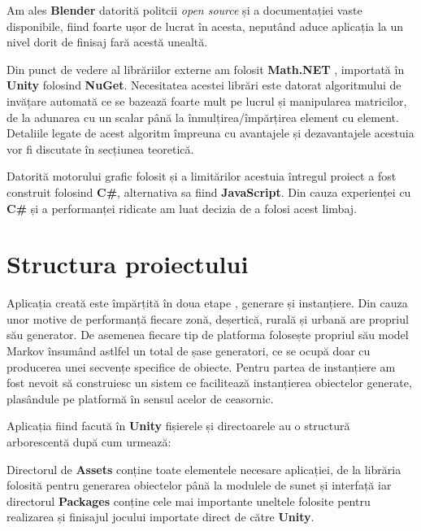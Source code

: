Am ales \textbf{Blender} datorită politcii \textit{open source} și a documentației vaste disponibile, fiind foarte ușor de lucrat în acesta, neputând aduce aplicația la un nivel dorit de finisaj fară acestă unealtă.\par

Din punct de vedere al librăriilor externe am folosit \textbf{Math.NET} , importată în \textbf{Unity} folosind \textbf{NuGet}. Necesitatea acestei librări este datorat algoritmului de invățare automată ce se bazează foarte mult pe lucrul și manipularea matricilor, de la adunarea cu un scalar până la înmulțirea/împărțirea element cu element. Detaliile legate de acest algoritm împreuna cu avantajele și dezavantajele acestuia vor fi discutate în secțiunea teoretică.\par

Datorită motorului grafic folosit și a limitărilor acestuia întregul proiect a fost construit folosind \textbf{C\#}, alternativa sa fiind \textbf{JavaScript}. Din cauza experienței cu \textbf{C\#} și a performanței ridicate am luat decizia de a folosi acest limbaj.\par

\section{Structura proiectului}

Aplicația creată este împărțită în doua etape , generare și instanțiere. Din cauza unor motive de performanță fiecare zonă, deșertică, rurală și urbană are propriul său generator. De asemenea fiecare tip de platforma folosește propriul său model Markov însumând astlfel un total de șase generatori, ce se ocupă doar cu producerea unei secvențe specifice de obiecte. Pentru partea de instanțiere am fost nevoit să construiesc un sistem ce facilitează instanțierea obiectelor generate, plasândule pe platformă în sensul acelor de ceasornic.\par

Aplicația fiind facută în \textbf{Unity} fișierele și directoarele au o structură arborescentă după cum urmează: \par

\par
Directorul de \textbf{Assets} conține toate elementele necesare aplicației, de la librăria folosită pentru generarea obiectelor până la modulele de sunet și interfață iar directorul \textbf{Packages} conține cele mai importante uneltele folosite pentru realizarea și finisajul jocului importate direct de către \textbf{Unity}.\par

